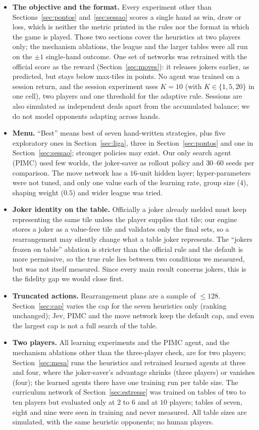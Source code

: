 \documentclass[11pt]{article}
\begin{document}
\begin{itemize}\itemsep0pt
\item \textbf{The objective and the format.} Every experiment other than Sections~\ref{sec:pontos} and~\ref{sec:sessao} scores a single hand as win, draw or loss, which is neither the metric printed in the rules nor the format in which the game is played. Those two sections cover the heuristics at two players only; the mechanism ablations, the league and the larger tables were all run on the $\pm1$ single-hand outcome. One set of networks was retrained with the official score as the reward (Section~\ref{sec:moves}): it releases jokers earlier, as predicted, but stays below max-tiles in points. No agent was trained on a session return, and the session experiment uses $K=10$ (with $K\in\{1,5,20\}$ in one cell), two players and one threshold for the adaptive rule. Sessions are also simulated as independent deals apart from the accumulated balance; we do not model opponents adapting across hands.
\item \textbf{Menu.} ``Best'' means best of seven hand-written strategies, plus five exploratory ones in Section~\ref{sec:liga}, three in Section~\ref{sec:pontos} and one in Section~\ref{sec:sessao}; stronger policies may exist. Our only search agent (PIMC) used few worlds, the joker-saver as rollout policy and $30$--$60$ seeds per comparison. The move network has a $16$-unit hidden layer; hyper-parameters were not tuned, and only one value each of the learning rate, group size ($4$), shaping weight ($0.5$) and wider league was tried.
\item \textbf{Joker identity on the table.} Officially a joker already melded must keep representing the same tile unless the player supplies that tile; our engine stores a joker as a value-free tile and validates only the final sets, so a rearrangement may silently change what a table joker represents. The ``jokers frozen on table'' ablation is stricter than the official rule and the default is more permissive, so the true rule lies between two conditions we measured, but was not itself measured. Since every main result concerns jokers, this is the fidelity gap we would close first.
\item \textbf{Truncated actions.} Rearrangement plans are a sample of $\le128$. Section~\ref{sec:cap} varies the cap for the seven heuristics only (ranking unchanged); Jev, PIMC and the move network keep the default cap, and even the largest cap is not a full search of the table.
\item \textbf{Two players.} All learning experiments and the PIMC agent, and the mechanism ablations other than the three-player check, are for two players; Section~\ref{sec:mesa} runs the heuristics and retrained learned agents at three and four, where the joker-saver's advantage shrinks (three players) or vanishes (four); the learned agents there have one training run per table size. The curriculum network of Section~\ref{sec:estresse} was trained on tables of two to ten players but evaluated only at $2$ to $6$ and at $10$ players; tables of seven, eight and nine were seen in training and never measured. All table sizes are simulated, with the same heuristic opponents; no human players.

\end{itemize}
\end{document}
